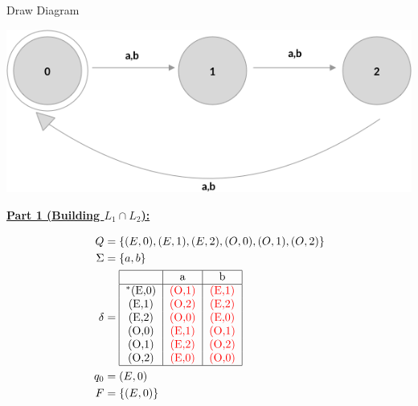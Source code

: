 \documentclass[12pt]{article}
\begin{document}
\begin{itemize}
\begin{mdframed}
    \bigskip

    Draw Diagram

    \begin{center}
    \includegraphics[width=0.7 \linewidth]{images/worksheet_8_solution_2.png}
    \end{center}

    \bigskip

    \underline{\textbf{Part 1 (Building $L_1 \cap L_2$):}}

    \bigskip

    \begin{align*}
        Q &= \{(E,0),(E,1),(E,2),(O,0),(O,1),(O,2)\}\\
        \Sigma &= \{a,b\}\\
        \delta &= \begin{tabular}{|c|c|c|}
        \hline
            & a & b\\
        \hline
        $^*$(E,0) & \color{red}(O,1)\color{black} & \color{red}(E,1)\color{black}\\
        (E,1)     & \color{red}(O,2)\color{black} & \color{red}(E,2)\color{black}\\
        (E,2)     & \color{red}(O,0)\color{black} & \color{red}(E,0)\color{black}\\
        (O,0)     & \color{red}(E,1)\color{black} & \color{red}(O,1)\color{black}\\
        (O,1)     & \color{red}(E,2)\color{black} & \color{red}(O,2)\color{black}\\
        (O,2)     & \color{red}(E,0)\color{black} & \color{red}(O,0)\color{black}\\
        \hline
        \end{tabular}\\
        q_0 &= (E,0)\\
        F &= \{(E,0)\}
    \end{align*}

    \end{mdframed}


\end{itemize}
\end{document}
